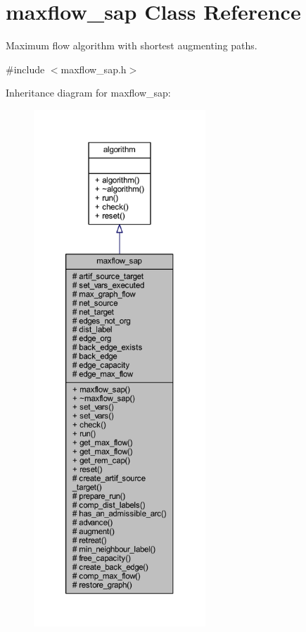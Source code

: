 \hypertarget{classmaxflow__sap}{}\section{maxflow\+\_\+sap Class Reference}
\label{classmaxflow__sap}


Maximum flow algorithm with shortest augmenting paths.  




{\ttfamily \#include $<$maxflow\+\_\+sap.\+h$>$}



Inheritance diagram for maxflow\+\_\+sap\+:\nopagebreak
\begin{figure}[H]
\begin{center}
\leavevmode
\includegraphics[height=550pt]{classmaxflow__sap__inherit__graph}
\end{center}
\end{figure}


